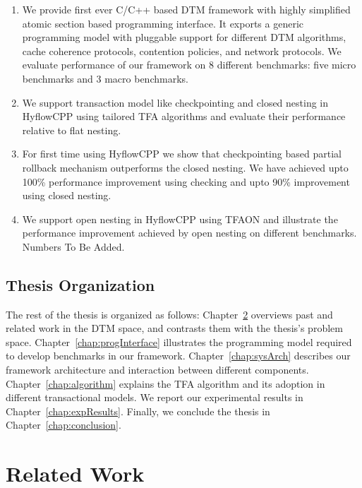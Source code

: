 \documentclass[12pt,english]{report}
\begin{document}
\begin{enumerate}
\item We provide first ever C/C++ based DTM framework with highly simplified atomic section based programming interface. It exports a generic programming model with pluggable support for different DTM algorithms, cache coherence protocols, contention policies, and network protocols. We evaluate performance of our framework on 8 different benchmarks: five micro benchmarks and 3 macro benchmarks.
\item We support transaction model like checkpointing and closed nesting in HyflowCPP using tailored TFA algorithms and evaluate their performance relative to flat nesting.  
\item For first time using HyflowCPP we show that checkpointing based partial rollback mechanism outperforms  the closed nesting. We have achieved upto 100\% performance improvement using checking and upto 90\% improvement using closed nesting. 
\item We support open nesting in HyflowCPP using TFAON and illustrate the performance improvement achieved by open nesting on different benchmarks. Numbers To Be Added.
\end{enumerate}

\section{Thesis Organization}

The rest of the thesis is organized as follows: Chapter~\ref{chap:relWork} overviews past and related work in the DTM space, and contrasts them with the thesis's problem space. Chapter~\ref{chap:progInterface} illustrates the programming model required to develop benchmarks in our framework. Chapter~\ref{chap:sysArch} describes our framework architecture and interaction between different components. Chapter~\ref{chap:algorithm} explains the TFA algorithm and its adoption in different transactional models. We report our experimental results in Chapter~\ref{chap:expResults}. Finally, we conclude the thesis in Chapter~\ref{chap:conclusion}.

\chapter{Related Work}\label{chap:relWork}
\end{document}

